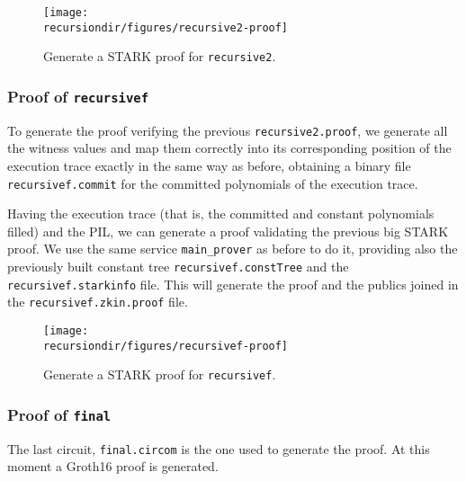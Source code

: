 \begin{figure}[H]
\centering
\texttt{[image: \\recursiondir/figures/recursive2-proof]}
\caption{Generate a STARK proof for \texttt{recursive2}.}
\label{fig:recursive2-proof}
\end{figure}


\subsubsection{Proof of \texttt{recursivef}}

To generate the proof verifying the previous \texttt{recursive2.proof}, we generate all the witness values and map them correctly into its corresponding position of the execution trace exactly in the same way as before, obtaining a binary file \texttt{recursivef.commit} for the committed polynomials of the execution trace. 

Having the execution trace (that is, the committed and constant polynomials filled) and the PIL, we can generate a proof validating the previous big STARK proof. We use the same service \texttt{main\_prover} as before to do it, providing also the previously built constant tree \texttt{recursivef.constTree} and the \texttt{recursivef.starkinfo} file. This will generate the proof and the publics joined in the \texttt{recursivef.zkin.proof} file. 


\begin{figure}[H]
\centering
\texttt{[image: \\recursiondir/figures/recursivef-proof]}
\caption{Generate a STARK proof for \texttt{recursivef}.}
\label{fig:recursivef-proof}
\end{figure}



\subsubsection{Proof of \texttt{final}}

The last circuit, \texttt{final.circom} is the one used to generate the proof.
At this moment a Groth16 proof is generated.
